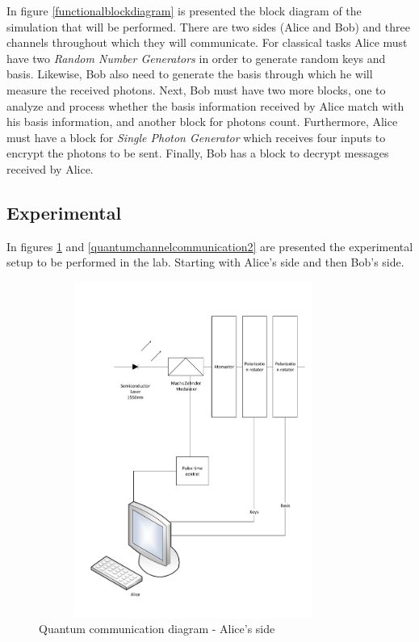 In figure \ref{functionalblockdiagram} is presented the block diagram of the simulation that will be performed. There are two sides (Alice and Bob) and three channels throughout which they will communicate. For classical tasks Alice must have two \textit{Random Number Generators} in order to generate random keys and basis. Likewise, Bob also need to generate the basis through which he will measure the received photons. Next, Bob must have two more blocks, one to analyze and process whether the basis information received by Alice match with his basis information, and another block for photons count. Furthermore, Alice must have a block for \textit{Single Photon Generator} which receives four inputs to encrypt the photons to be sent. Finally, Bob has a block to decrypt messages received by Alice.

\subsection{Experimental}
In figures \ref{quantumchannelcommunication1} and \ref{quantumchannelcommunication2} are presented the experimental setup to be performed in the lab. Starting with Alice's side and then Bob's side.

\begin{figure}[H]
	\centering \includegraphics[width=0.9\textwidth,height=11cm]{./sdf/ot_with_discrete_variables/figures/OT_experimental_alice.pdf}
	\caption{Quantum communication diagram - Alice's side}\label{quantumchannelcommunication1}
\end{figure}


